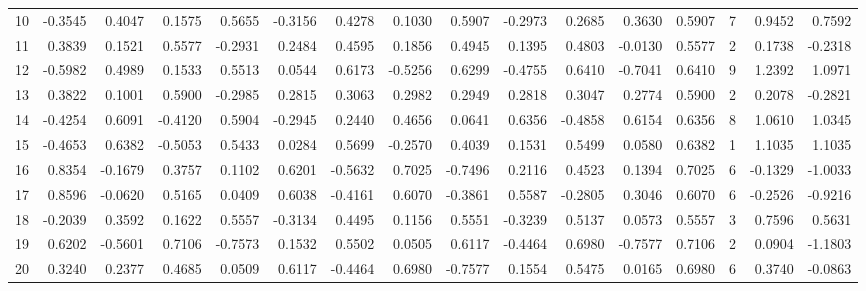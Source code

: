 \begin{tabular}{lrrrrrrrrrrrrrrr}
10  &     -0.3545 &  0.4047 &  0.1575 &  0.5655 & -0.3156 &  0.4278 &  0.1030 &  0.5907 & -0.2973 &  0.2685 &   0.3630 &     0.5907 &      7 &                    0.9452 &                     0.7592 \\
11  &      0.3839 &  0.1521 &  0.5577 & -0.2931 &  0.2484 &  0.4595 &  0.1856 &  0.4945 &  0.1395 &  0.4803 &  -0.0130 &     0.5577 &      2 &                    0.1738 &                    -0.2318 \\
12  &     -0.5982 &  0.4989 &  0.1533 &  0.5513 &  0.0544 &  0.6173 & -0.5256 &  0.6299 & -0.4755 &  0.6410 &  -0.7041 &     0.6410 &      9 &                    1.2392 &                     1.0971 \\
13  &      0.3822 &  0.1001 &  0.5900 & -0.2985 &  0.2815 &  0.3063 &  0.2982 &  0.2949 &  0.2818 &  0.3047 &   0.2774 &     0.5900 &      2 &                    0.2078 &                    -0.2821 \\
14  &     -0.4254 &  0.6091 & -0.4120 &  0.5904 & -0.2945 &  0.2440 &  0.4656 &  0.0641 &  0.6356 & -0.4858 &   0.6154 &     0.6356 &      8 &                    1.0610 &                     1.0345 \\
15  &     -0.4653 &  0.6382 & -0.5053 &  0.5433 &  0.0284 &  0.5699 & -0.2570 &  0.4039 &  0.1531 &  0.5499 &   0.0580 &     0.6382 &      1 &                    1.1035 &                     1.1035 \\
16  &      0.8354 & -0.1679 &  0.3757 &  0.1102 &  0.6201 & -0.5632 &  0.7025 & -0.7496 &  0.2116 &  0.4523 &   0.1394 &     0.7025 &      6 &                   -0.1329 &                    -1.0033 \\
17  &      0.8596 & -0.0620 &  0.5165 &  0.0409 &  0.6038 & -0.4161 &  0.6070 & -0.3861 &  0.5587 & -0.2805 &   0.3046 &     0.6070 &      6 &                   -0.2526 &                    -0.9216 \\
18  &     -0.2039 &  0.3592 &  0.1622 &  0.5557 & -0.3134 &  0.4495 &  0.1156 &  0.5551 & -0.3239 &  0.5137 &   0.0573 &     0.5557 &      3 &                    0.7596 &                     0.5631 \\
19  &      0.6202 & -0.5601 &  0.7106 & -0.7573 &  0.1532 &  0.5502 &  0.0505 &  0.6117 & -0.4464 &  0.6980 &  -0.7577 &     0.7106 &      2 &                    0.0904 &                    -1.1803 \\
20  &      0.3240 &  0.2377 &  0.4685 &  0.0509 &  0.6117 & -0.4464 &  0.6980 & -0.7577 &  0.1554 &  0.5475 &   0.0165 &     0.6980 &      6 &                    0.3740 &                    -0.0863 \\

\end{tabular}
